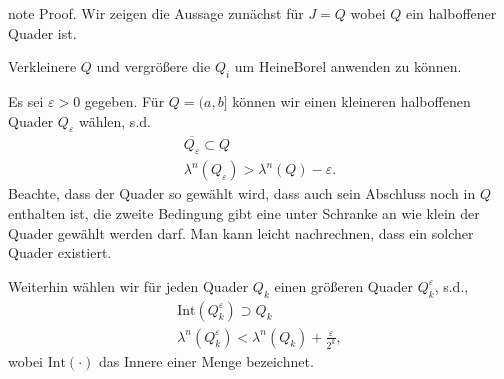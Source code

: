 \documentclass[letterpaper,10pt,english]{jupyterBook}
\begin{document}
\begin{sphinxadmonition}{note}
\sphinxAtStartPar
Proof. Wir zeigen die Aussage zunächst für \(J=Q\) wobei \(Q\) ein halboffener Quader ist.

\sphinxAtStartPar
{} Verkleinere \(Q\) und vergrößere die \(Q_i\) um Heine\sphinxhyphen{}Borel anwenden zu können.

\sphinxAtStartPar
Es sei \(\varepsilon>0\) gegeben. Für \(Q=(a,b]\) können wir einen kleineren halboffenen Quader \(Q_\varepsilon\) wählen, s.d.
\begin{equation*}
\begin{split}\overline{Q_\varepsilon} \subset Q\\
\lambda^n(Q_\varepsilon) > \lambda^n(Q) - \varepsilon.\end{split}
\end{equation*}
\sphinxAtStartPar
Beachte, dass der Quader so gewählt wird, dass auch sein Abschluss noch in \(Q\) enthalten ist, die zweite Bedingung gibt eine unter Schranke an wie klein der Quader gewählt werden darf. Man kann leicht nachrechnen, dass ein solcher Quader existiert.

\sphinxAtStartPar
Weiterhin wählen wir für jeden Quader \(Q_k\) einen größeren Quader \(Q_k^\varepsilon\), s.d.,
\begin{equation*}
\begin{split}\text{Int}(Q_k^\varepsilon)\supset Q_k\\
\lambda^n(Q_k^\varepsilon) < \lambda^n(Q_k) + \frac{\varepsilon}{2^k},\end{split}
\end{equation*}
\sphinxAtStartPar
wobei \(\text{Int}(\cdot)\) das Innere einer Menge bezeichnet.


\end{sphinxadmonition}
\end{document}
